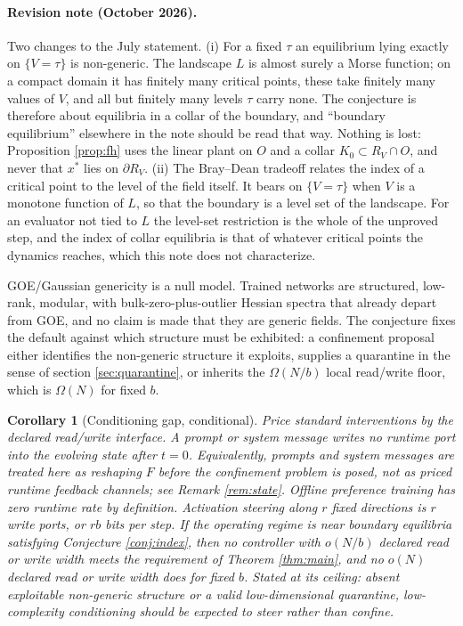 \documentclass[11pt]{article}
\newtheorem{corollary}{Corollary}[section]
\theoremstyle{definition}
\theoremstyle{remark}
\newcommand{\RV}{R_V}
\begin{document}
\paragraph{Revision note (October 2026).} Two changes to the July statement. (i) For a fixed $\tau$ an equilibrium lying exactly on $\{V=\tau\}$ is non-generic. The landscape $L$ is almost surely a Morse function; on a compact domain it has finitely many critical points, these take finitely many values of $V$, and all but finitely many levels $\tau$ carry none. The conjecture is therefore about equilibria in a collar of the boundary, and ``boundary equilibrium'' elsewhere in the note should be read that way. Nothing is lost: Proposition \ref{prop:fh} uses the linear plant on $O$ and a collar $K_0\subset\RV\cap O$, and never that $x^*$ lies on $\partial\RV$. (ii) The Bray--Dean tradeoff relates the index of a critical point to the level of the field itself. It bears on $\{V=\tau\}$ when $V$ is a monotone function of $L$, so that the boundary is a level set of the landscape. For an evaluator not tied to $L$ the level-set restriction is the whole of the unproved step, and the index of collar equilibria is that of whatever critical points the dynamics reaches, which this note does not characterize.

GOE/Gaussian genericity is a null model. Trained networks are structured, low-rank, modular, with bulk-zero-plus-outlier Hessian spectra that already depart from GOE, and no claim is made that they are generic fields. The conjecture fixes the default against which structure must be exhibited: a confinement proposal either identifies the non-generic structure it exploits, supplies a quarantine in the sense of section \ref{sec:quarantine}, or inherits the $\Omega(N/b)$ local read/write floor, which is $\Omega(N)$ for fixed $b$.

\begin{corollary}[Conditioning gap, conditional]\label{cor:gap}
Price standard interventions by the declared read/write interface. A prompt or system message writes no runtime port into the evolving state after $t=0$. Equivalently, prompts and system messages are treated here as reshaping $F$ before the confinement problem is posed, not as priced runtime feedback channels; see Remark \ref{rem:state}. Offline preference training has zero runtime rate by definition. Activation steering along $r$ fixed directions \cite{turner2023,li2023iti,zou2023} is $r$ write ports, or $rb$ bits per step. If the operating regime is near boundary equilibria satisfying Conjecture \ref{conj:index}, then no controller with $o(N/b)$ declared read or write width meets the requirement of Theorem \ref{thm:main}, and no $o(N)$ declared read or write width does for fixed $b$. Stated at its ceiling: absent exploitable non-generic structure or a valid low-dimensional quarantine, low-complexity conditioning should be expected to steer rather than confine.
\end{corollary}
\end{document}
